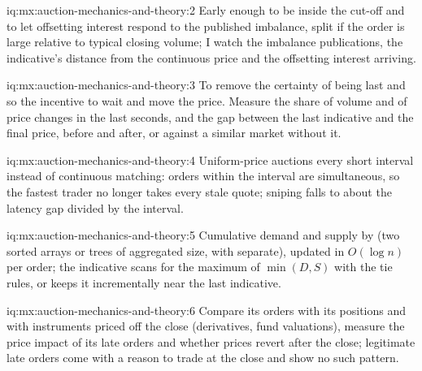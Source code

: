 \begin{solution}{iq:mx:auction-mechanics-and-theory:2}
Early enough to be inside the cut-off and to let offsetting interest respond to the published imbalance, split if the order is large relative to typical
closing volume; I watch the imbalance publications, the indicative's distance from the continuous price and the offsetting interest arriving.
\end{solution}

\begin{solution}{iq:mx:auction-mechanics-and-theory:3}
To remove the certainty of being last and so the incentive to wait and move the price. Measure the share of volume and of price changes in the last
seconds, and the gap between the last indicative and the final price, before and after, or against a similar market without it.
\end{solution}

\begin{solution}{iq:mx:auction-mechanics-and-theory:4}
Uniform-price auctions every short interval instead of continuous matching: orders within the interval are simultaneous, so the fastest trader no longer
takes every stale quote; sniping falls to about the latency gap divided by the interval.
\end{solution}

\begin{solution}{iq:mx:auction-mechanics-and-theory:5}
Cumulative demand and supply by  (two sorted arrays or trees of aggregated size, with  separate), updated in $O(\log n)$ per
order; the indicative scans for the maximum of $\min(D,S)$ with the tie rules, or keeps it incrementally near the last indicative.
\end{solution}

\begin{solution}{iq:mx:auction-mechanics-and-theory:6}
Compare its orders with its positions and with instruments priced off the close (derivatives, fund valuations), measure the price impact of its late
orders and whether prices revert after the close; legitimate late orders come with a reason to trade at the close and show no such pattern.
\end{solution}
